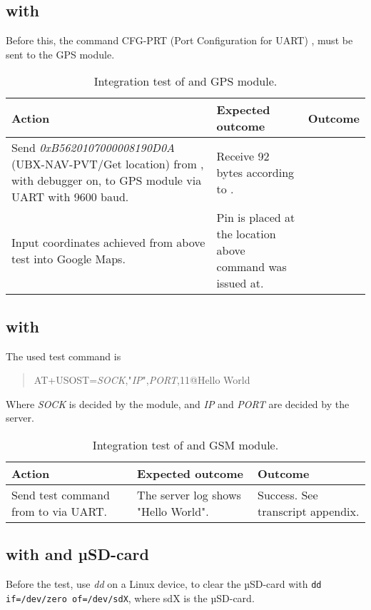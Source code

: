 \subsection{\MKR with \GPS}
Before this, the command CFG-PRT (Port Configuration for UART) \cite[p.~119-120]{NEO7_proto}, must be sent to the GPS module.

\begin{table}[H]
	\centering
	\begin{tabularx}{\textwidth}{p{4.3cm} X X}
		\toprule
		\textbf{Action} & \textbf{Expected outcome} & \textbf{Outcome} \\
		\midrule
		Send \textit{0xB5620107000008190D0A} (UBX-NAV-PVT/Get location) from \MKR, with debugger on, to GPS module via UART with \num{9600} baud. & Receive \num{92} bytes according to \cite[p.~160-161]{NEO7_proto}. & \\
		Input coordinates achieved from above test into Google Maps. & Pin is placed at the location above command was issued at. & \\
		\bottomrule
	\end{tabularx}
	\caption{Integration test of \MKR and \GPS GPS module.}
	\label{AT:intGPS}
\end{table}

\subsection{\MKR with \SARA}
The used test command is
\begin{quote}
	AT+USOST=\textit{SOCK},"\textit{IP}",\textit{PORT},11@Hello World
\end{quote}
Where \textit{SOCK} is decided by the \SARA module, and \textit{IP} and \textit{PORT} are decided by the server.

\begin{table}[H]
	\centering
	\begin{tabularx}{\textwidth}{p{4.3cm} X X}
		\toprule
		\textbf{Action} & \textbf{Expected outcome} & \textbf{Outcome} \\
		\midrule
		Send test command from \MKR to \SARA via UART. & The server log shows "Hello World". & Success. See transcript appendix. \fxnote{Reference}\\
		\bottomrule
	\end{tabularx}
	\caption{Integration test of \MKR and \SARA GSM module.}
	\label{AT:intGSM}
\end{table}

\subsection{\MKR with \SDsock and µSD-card}
Before the test, use \textit{dd} on a Linux device, to clear the µSD-card with \texttt{dd if=/dev/zero of=/dev/sdX}, where sdX is the µSD-card.

